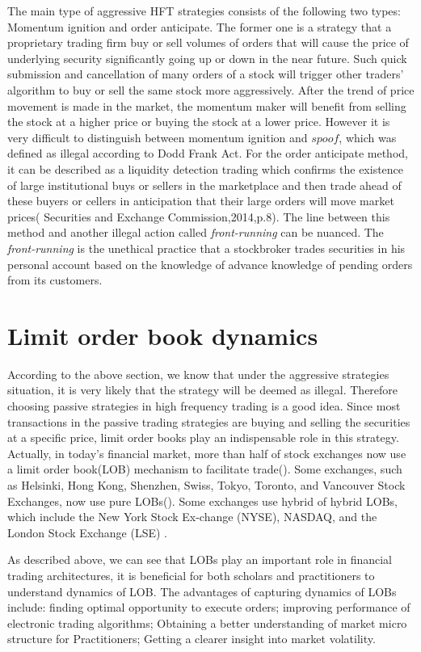 The main type of aggressive HFT strategies consists of the following two types:
Momentum ignition and order anticipate. The former one is a strategy that a proprietary trading firm buy or sell volumes of orders that will cause the price of underlying security significantly going up or down in the near future. Such quick submission and cancellation of many orders of a stock will trigger other traders' algorithm  to buy or sell the same stock more aggressively. After the trend of price movement is made in the market, the momentum maker will benefit from selling the stock at a higher price or buying the stock at a lower price. However it is very difficult to distinguish between momentum ignition and $\textit{spoof}$, which was defined as illegal according to Dodd Frank Act.  For the order anticipate method, it can be described as a liquidity detection trading which confirms the existence of large institutional buys or sellers in the marketplace and then trade ahead of these buyers or cellers in anticipation that their large orders will move market prices( Securities and Exchange Commission,2014,p.8). The line between this method and another illegal action called \textit{front-running} can be nuanced. The \textit{front-running} is the unethical practice that a stockbroker trades securities in his personal account based on the knowledge of advance knowledge of pending orders from its customers. 

\section{Limit order book dynamics}
According to the above section, we know that under the aggressive strategies situation, it is very likely that the strategy will be deemed as illegal. Therefore choosing passive strategies in high frequency trading is a good idea. Since most transactions in the passive trading strategies are buying and selling the securities at a specific price, limit order books play an indispensable role in this strategy.  
Actually, in today's financial market, more than half of stock exchanges now use a limit order book(LOB) mechanism to facilitate trade(\cite{rosu2009dynamic}).  Some exchanges, such as Helsinki, Hong Kong, Shenzhen, Swiss, Tokyo, Toronto, and
Vancouver Stock Exchanges, now use pure LOBs(\cite{luckock2001statistical}). Some exchanges use hybrid of hybrid LOBs, which include  the New York Stock Ex-change (NYSE), NASDAQ, and the London Stock Exchange
(LSE) \citep{cont2010stochastic}. 

As described above, we can see that LOBs play an important role in financial trading architectures, it is beneficial for both scholars and practitioners to understand dynamics of LOB. The advantages of capturing dynamics of LOBs include: finding optimal opportunity to execute orders\citep{obizhaeva2013optimal}; improving performance of electronic trading algorithms\citep{engle2006measuring}; Obtaining a better understanding of market micro structure for Practitioners\citep{harris2003trading}; Getting a clearer insight into market volatility\citep{kirilenko2015flash}.

